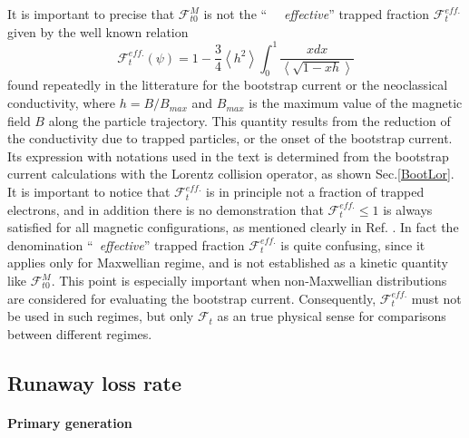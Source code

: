 It is important to precise that $\mathcal{F}_{t0}^{M}$ is not the ``\textit{%
\ \ effective}'' trapped fraction $\mathcal{F}_{t}^{eff.}$ given by the well
known relation
\begin{equation}
\mathcal{F}_{t}^{eff.}\left( \psi\right) =1-\frac{3}{4}\left\langle
h^{2}\right\rangle \int_{0}^{1}\frac{xdx}{\left\langle \sqrt{1-xh}
\right\rangle }
\end{equation}
found repeatedly in the litterature for the bootstrap current or the
neoclassical conductivity, where $h=B/B_{max}$ and $B_{max}$ is the maximum
value of the magnetic field $B$ along the particle trajectory. This quantity
results from the reduction of the conductivity due to trapped particles, or
the onset of the bootstrap current. Its expression with notations used in
the text is determined from the bootstrap current calculations with the
Lorentz collision operator, as shown Sec.\ref{BootLor}. It is important to
notice that $\mathcal{F}_{t}^{eff.}$ is in principle not a fraction of
trapped electrons, and in addition there is no demonstration that $\mathcal{F%
}_{t}^{eff.}\leq1$ is always satisfied for all magnetic configurations, as
mentioned clearly in Ref. \cite{bal88}. In fact the denomination ``\textit{\
effective}'' trapped fraction $\mathcal{F}_{t}^{eff.}$ is quite confusing,
since it applies only for Maxwellian regime, and is not established as a
kinetic quantity like $\mathcal{F}_{t0}^{M}.$ This point is especially
important when non-Maxwellian distributions are considered for evaluating
the bootstrap current. Consequently, $\mathcal{F}_{t}^{eff.}$ must not be
used in such regimes, but only $\mathcal{F}_{t}$ as an true physical sense
for comparisons between different regimes.

\subsection{Runaway loss rate}

\paragraph{Primary generation}

